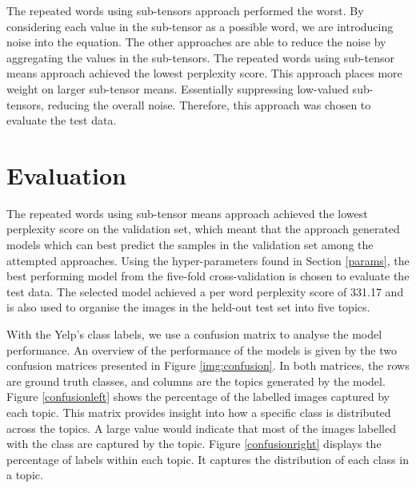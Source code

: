 \documentclass{article}
\begin{document}
The repeated words using sub-tensors approach performed the worst. By considering each value in the sub-tensor as a possible word, we are introducing noise into the equation. The other approaches are able to reduce the noise by aggregating the values in the sub-tensors. The repeated words using sub-tensor means approach achieved the lowest perplexity score. This approach places more weight on larger sub-tensor means. Essentially suppressing low-valued sub-tensors, reducing the overall noise. Therefore, this approach was chosen to evaluate the test data. 

\section{Evaluation}
The repeated words using sub-tensor means approach achieved the lowest perplexity score on the validation set, which meant that the approach generated models which can best predict the samples in the validation set among the attempted approaches. Using the hyper-parameters found in Section \ref{params}, the best performing model from the five-fold cross-validation is chosen to evaluate the test data. The selected model achieved a per word perplexity score of 331.17 and is also used to organise the images in the held-out test set into five topics. 

With the Yelp's class labels, we use a confusion matrix to analyse the model performance. An overview of the performance of the models is given by the two confusion matrices presented in Figure \ref{img:confusion}. In both matrices, the rows are ground truth classes, and columns are the topics generated by the model. Figure \ref{confusionleft} shows the percentage of the labelled images captured by each topic. This matrix provides insight into how a specific class is distributed across the topics. A large value would indicate that most of the images labelled with the class are captured by the topic. Figure \ref{confusionright} displays the percentage of labels within each topic. It captures the distribution of each class in a topic.
\end{document}
